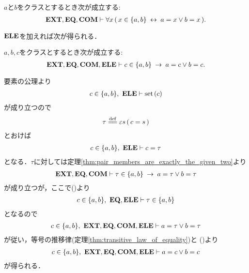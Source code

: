 	\begin{screen}
		\begin{thm}[対は表示されている要素しか持たない]
		\label{thm:pair_members_are_exactly_the_given_two}
			$a$と$b$をクラスとするとき次が成立する:
			\begin{align}
				\mbox{{\bf EXT}},\mbox{{\bf EQ}},\mbox{\bf COM} \vdash 
				\forall x\, (\, x \in \{a,b\} \hspace{0.25em}\leftrightarrow\hspace{0.25em} a = x \vee b = x\, ).
			\end{align}
		\end{thm}
	\end{screen}
	
	$\mbox{{\bf ELE}}$を加えれば次が得られる．
	
	\begin{screen}
		\begin{thm}[対の要素は表示されている要素の一方には等しい]
		\label{cor:pair_members_are_exactly_the_given_two}
			$a,b,c$をクラスとするとき次が成立する:
			\begin{align}
				\mbox{{\bf EXT}},\mbox{{\bf EQ}},\mbox{\bf COM},\mbox{{\bf ELE}} \vdash 
				c \in \{a,b\} \hspace{0.25em}\rightarrow\hspace{0.25em} a = c \vee b = c.
			\end{align}
		\end{thm}
	\end{screen}
	
	\begin{sketch}
		要素の公理より
		\begin{align}
			c \in \{a,b\},\ \mbox{{\bf ELE}} \vdash \operatorname*{set}\hspace{0.15em}(c)
		\end{align}
		が成り立つので
		\begin{align}
			\tau \defeq \varepsilon s\, (\, c = s\, )
		\end{align}
		とおけば
		\begin{align}
			c \in \{a,b\},\ \mbox{{\bf ELE}} \vdash c = \tau
			\label{fom:pair_members_are_exactly_the_given_two_2}
		\end{align}
		となる．$\tau$に対しては定理\ref{thm:pair_members_are_exactly_the_given_two}より 
		\begin{align}
			\mbox{{\bf EXT}},\mbox{{\bf EQ}},\mbox{\bf COM} \vdash 
			\tau \in \{a,b\} \hspace{0.25em}\rightarrow\hspace{0.25em} a = \tau \vee b = \tau
		\end{align}
		が成り立つが，ここで()より
		\begin{align}
			c \in \{a,b\},\ \mbox{{\bf EQ}},\mbox{{\bf ELE}} \vdash \tau \in \{a,b\}
		\end{align}
		となるので
		\begin{align}
			c \in \{a,b\},\ \mbox{{\bf EXT}},\mbox{{\bf EQ}},\mbox{\bf COM},\mbox{{\bf ELE}} \vdash a = \tau \vee b = \tau
		\end{align}
		が従い，等号の推移律(定理\ref{thm:transitive_law_of_equality})と
		()より
		\begin{align}
			c \in \{a,b\},\ \mbox{{\bf EXT}},\mbox{{\bf EQ}},\mbox{\bf COM},\mbox{{\bf ELE}} \vdash a = c \vee b = c
		\end{align}
		が得られる．
		\QED
	\end{sketch}
	
